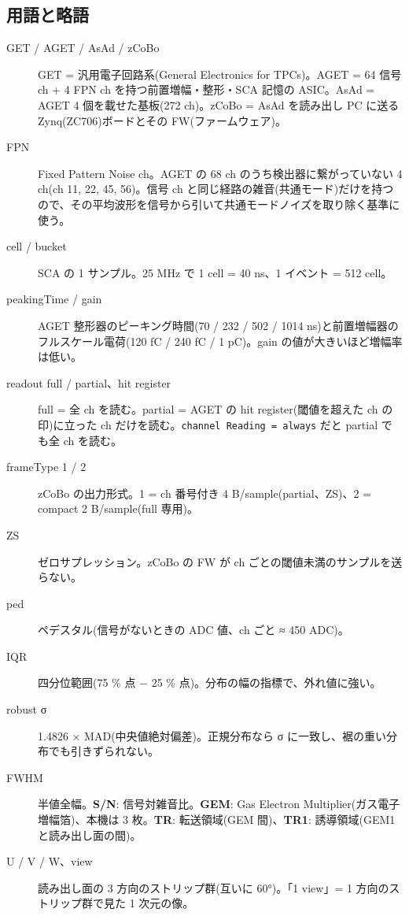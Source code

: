 \documentclass[a4paper,11pt]{ltjsarticle}
\begin{document}
\subsection{用語と略語}
\begin{description}
\item[GET / AGET / AsAd / zCoBo] GET = 汎用電子回路系(General Electronics for TPCs)。AGET = 64 信号 ch + 4 FPN ch を持つ前置増幅・整形・SCA 記憶の ASIC。AsAd = AGET 4 個を載せた基板(272 ch)。zCoBo = AsAd を読み出し PC に送る Zynq(ZC706)ボードとその FW(ファームウェア)。
\item[FPN] Fixed Pattern Noise ch。AGET の 68 ch のうち検出器に繋がっていない 4 ch(ch 11, 22, 45, 56)。信号 ch と同じ経路の雑音(共通モード)だけを持つので、その平均波形を信号から引いて共通モードノイズを取り除く基準に使う。
\item[cell / bucket] SCA の 1 サンプル。25 MHz で 1 cell = 40 ns、1 イベント = 512 cell。
\item[peakingTime / gain] AGET 整形器のピーキング時間(70 / 232 / 502 / 1014 ns)と前置増幅器のフルスケール電荷(120 fC / 240 fC / 1 pC)。gain の値が大きいほど増幅率は低い。
\item[readout full / partial、hit register] full = 全 ch を読む。partial = AGET の hit register(閾値を超えた ch の印)に立った ch だけを読む。\texttt{channel Reading = always} だと partial でも全 ch を読む。
\item[frameType 1 / 2] zCoBo の出力形式。1 = ch 番号付き 4 B/sample(partial、ZS)、2 = compact 2 B/sample(full 専用)。
\item[ZS] ゼロサプレッション。zCoBo の FW が ch ごとの閾値未満のサンプルを送らない。
\item[ped] ペデスタル(信号がないときの ADC 値、ch ごと ≈ 450 ADC)。
\item[IQR] 四分位範囲(75 \% 点 − 25 \% 点)。分布の幅の指標で、外れ値に強い。
\item[robust σ] 1.4826 × MAD(中央値絶対偏差)。正規分布なら σ に一致し、裾の重い分布でも引きずられない。
\item[FWHM] 半値全幅。\textbf{S/N}: 信号対雑音比。\textbf{GEM}: Gas Electron Multiplier(ガス電子増幅箔)、本機は 3 枚。\textbf{TR}: 転送領域(GEM 間)、\textbf{TR1}: 誘導領域(GEM1 と読み出し面の間)。
\item[U / V / W、view] 読み出し面の 3 方向のストリップ群(互いに 60°)。「1 view」= 1 方向のストリップ群で見た 1 次元の像。
\end{description}
\end{document}

